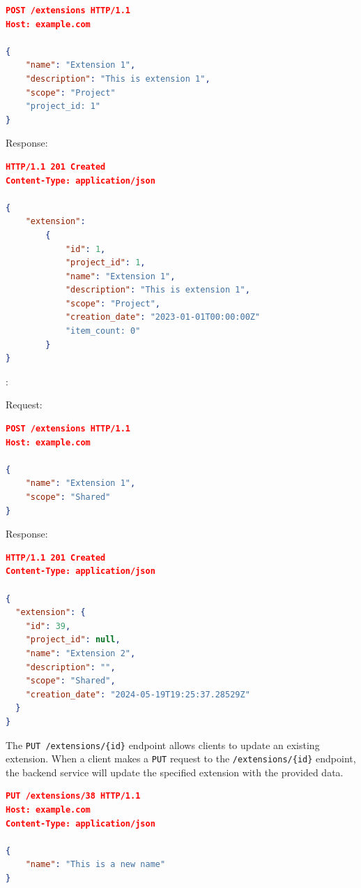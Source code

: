 \begin{lstlisting}[language=json,label={lst:lstlisting26}]
POST /extensions HTTP/1.1
Host: example.com

{
    "name": "Extension 1",
    "description": "This is extension 1",
    "scope": "Project"
    "project_id: 1"
}
\end{lstlisting}

Response:

\begin{lstlisting}[language=json,label={lst:lstlisting23}]
HTTP/1.1 201 Created
Content-Type: application/json

{
    "extension":
        {
            "id": 1,
            "project_id": 1,
            "name": "Extension 1",
            "description": "This is extension 1",
            "scope": "Project",
            "creation_date": "2023-01-01T00:00:00Z"
            "item_count: 0"
        }
}
\end{lstlisting}

:


Request:

\begin{lstlisting}[language=json,label={lst:lstlisting27}]
POST /extensions HTTP/1.1
Host: example.com

{
    "name": "Extension 1",
    "scope": "Shared"
}
\end{lstlisting}


Response:

\begin{lstlisting}[language=json,label={lst:lstlisting28}]
HTTP/1.1 201 Created
Content-Type: application/json

{
  "extension": {
    "id": 39,
    "project_id": null,
    "name": "Extension 2",
    "description": "",
    "scope": "Shared",
    "creation_date": "2024-05-19T19:25:37.28529Z"
  }
}
\end{lstlisting}


The \texttt{PUT /extensions/\{id\}} endpoint allows clients to update an existing extension.
When a client makes a \texttt{PUT} request to the \texttt{/extensions/\{id\}} endpoint, the backend service will update the specified extension with the provided data.

\begin{lstlisting}[language=json,label={lst:lstlisting29}]
PUT /extensions/38 HTTP/1.1
Host: example.com
Content-Type: application/json

{
    "name": "This is a new name"
}
\end{lstlisting}

